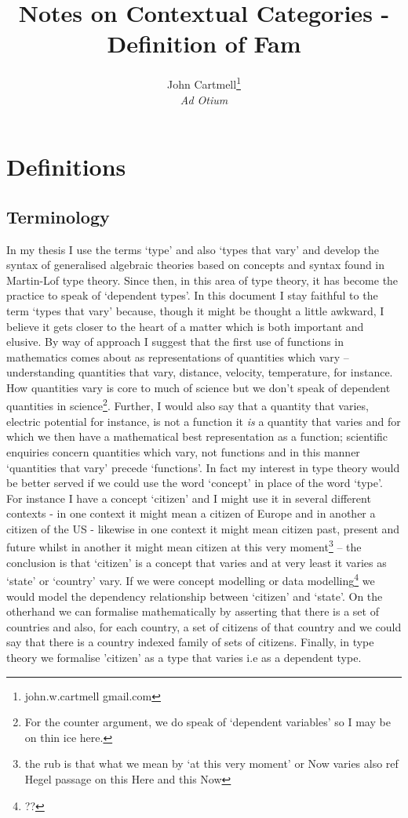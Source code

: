 \documentclass[10pt,a4paper]{scrartcl}
\title{Notes on Contextual Categories - Definition of Fam}
\author{John Cartmell\footnote{john.w.cartmell gmail.com}\\ \normalsize{\textit{Ad Otium}}}
\begin{document}
\maketitle

\section{Definitions}
\subsection{Terminology}
In my thesis I use the terms  `type' and also `types that vary' and develop the syntax of generalised algebraic theories based on concepts and syntax found in Martin-Lof type theory.
Since then, in this area of type theory,  it has become the practice to speak of `dependent types'. In this document I stay faithful to the term `types that vary' because, though it might be thought a little awkward, I believe it gets closer to the heart of a matter which is both important and elusive.
By way of approach I suggest that the first use of functions in mathematics comes about as representations of quantities which vary -- understanding quantities that vary, distance, velocity, temperature, for instance. How quantities vary is core to much of science but we don't speak of dependent quantities in science\footnote{For the counter argument, we do speak of `dependent variables' so I may be on thin ice here.}. Further, I would also say that a quantity that varies,  electric potential for instance, is not a function it \textit{is} a quantity that varies and for which we then have a mathematical best representation as a function; scientific enquiries concern quantities which vary, not functions and in 
this manner `quantities that vary' precede `functions'. 
\noindent
In fact my interest in type theory would be better served if we could use the
word `concept' in place of the word `type'. For instance I have a concept `citizen' and I might use it in several different contexts - in one context it might mean a citizen of Europe and in another a citizen of the US - likewise in one context it might mean citizen past, present and future whilst in another it might mean citizen at this very moment\footnote{the rub is that what we mean by `at this very moment' or Now varies also ref Hegel passage on this Here and this Now}  -- the conclusion is that `citizen' is a concept that varies and at very least it varies as `state' or `country' vary. If we were concept modelling or data modelling\footnote{??} we would model the dependency relationship between `citizen' 
and `state'. On the otherhand we can formalise mathematically by asserting that there is a set of countries
and also, for each country, a set of citizens of that country and we could say that there is a country indexed family of sets of citizens. Finally, in type theory we formalise 'citizen' as 
a type that varies i.e as a dependent type.  
\end{document}
